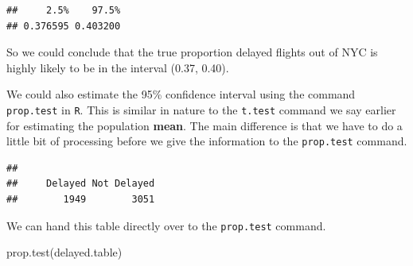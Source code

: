 \documentclass[
]{book}
\newenvironment{Shaded}{\begin{snugshade}}{\end{snugshade}}
\newcommand{\AttributeTok}[1]{\textcolor[rgb]{0.77,0.63,0.00}{#1}}
\newcommand{\ConstantTok}[1]{\textcolor[rgb]{0.00,0.00,0.00}{#1}}
\newcommand{\DecValTok}[1]{\textcolor[rgb]{0.00,0.00,0.81}{#1}}
\newcommand{\FloatTok}[1]{\textcolor[rgb]{0.00,0.00,0.81}{#1}}
\newcommand{\FunctionTok}[1]{\textcolor[rgb]{0.00,0.00,0.00}{#1}}
\newcommand{\NormalTok}[1]{#1}
\newcommand{\OtherTok}[1]{\textcolor[rgb]{0.56,0.35,0.01}{#1}}
\newcommand{\SpecialCharTok}[1]{\textcolor[rgb]{0.00,0.00,0.00}{#1}}
\newcommand{\StringTok}[1]{\textcolor[rgb]{0.31,0.60,0.02}{#1}}
\theoremstyle{definition}
\theoremstyle{definition}
\theoremstyle{definition}
\theoremstyle{definition}
\theoremstyle{remark}
\begin{document}
\begin{Shaded}
\end{Shaded}

\begin{verbatim}
##     2.5%    97.5% 
## 0.376595 0.403200
\end{verbatim}

So we could conclude that the true proportion delayed flights out of NYC is highly likely to be in the interval (0.37, 0.40).

We could also estimate the 95\% confidence interval using the command \texttt{prop.test} in \texttt{R}. This is similar in nature to the \texttt{t.test} command we say earlier for estimating the population \textbf{mean}. The main difference is that we have to do a little bit of processing before we give the information to the \texttt{prop.test} command.

\begin{Shaded}
\end{Shaded}

\begin{verbatim}
## 
##     Delayed Not Delayed 
##        1949        3051
\end{verbatim}

We can hand this table directly over to the \texttt{prop.test} command.

\begin{Shaded}
\begin{Highlighting}[]
\FunctionTok{prop.test}\NormalTok{(delayed.table)}
\end{Highlighting}
\end{Shaded}
\end{document}
